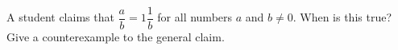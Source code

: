 A student claims that $\dfrac {a}{b}=1\dfrac{1}{b}$ for all numbers $a$ and $b\ne0$. When is this true? Give a counterexample to the general claim.
